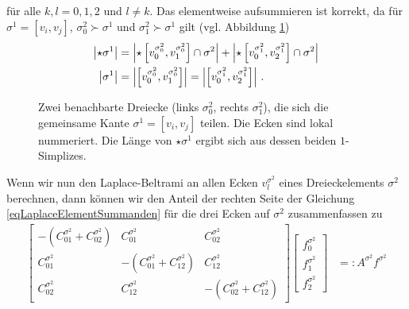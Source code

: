     für alle \( k,l = 0,1,2 \) und \( l\neq k \).
    Das elementweise aufsummieren ist korrekt, da für \( \sigma^{1}=\left[ v_{i}, v_{j} \right]\),
    \( \sigma^{2}_{0}\succ\sigma^{1} \) und \( \sigma^{2}_{1}\succ\sigma^{1} \) gilt
    (vgl. Abbildung \ref{figLokaleNummerierung})
    \begin{align}
      \left| \star\sigma^{1} \right| 
        &= \left| \star \left[ v^{\sigma^{2}_{0}}_{0}, v^{\sigma^{2}_{0}}_{1} \right] \cap \sigma^{2}\right|
         + \left| \star \left[ v^{\sigma^{2}_{1}}_{0}, v^{\sigma^{2}_{1}}_{2} \right] \cap \sigma^{2}\right| \\
      \left| \sigma^{1} \right| 
          &= \left|  \left[ v^{\sigma^{2}_{0}}_{0}, v^{\sigma^{2}_{0}}_{1} \right] \right|
           = \left|  \left[ v^{\sigma^{2}_{1}}_{0}, v^{\sigma^{2}_{1}}_{2} \right] \right| \,\text{.}
    \end{align}
    \begin{figure}
      \centering
      \caption[lokale Nummerierung]{Zwei benachbarte Dreiecke (links \( \sigma^{2}_{0} \), rechts \(
          \sigma^{2}_{1} \)), die sich die gemeinsame Kante \( \sigma^{1}=\left[ v_{i}, v_{j} \right] \) teilen.
          Die Ecken sind lokal nummeriert.
          Die Länge von \( \star\sigma^{1} \) ergibt sich aus dessen beiden \( 1 \)-Simplizes.}
      \label{figLokaleNummerierung}
    \end{figure}
    Wenn wir nun den Laplace-Beltrami an allen Ecken \( v^{\sigma^{2}}_{l} \) eines Dreieckelements 
    \( \sigma^{2} \) berechnen, dann können wir den Anteil der rechten Seite
    der Gleichung \eqref{eqLaplaceElementSummanden}
    für die drei Ecken auf \( \sigma^{2} \) zusammenfassen zu
    \begin{align}
      \begin{bmatrix}
        -\left( C^{\sigma^{2}}_{01} + C^{\sigma^{2}}_{02}\right) & C^{\sigma^{2}}_{01} & C^{\sigma^{2}}_{02} \\
        C^{\sigma^{2}}_{01} & -\left( C^{\sigma^{2}}_{01} + C^{\sigma^{2}}_{12}\right) & C^{\sigma^{2}}_{12} \\
        C^{\sigma^{2}}_{02} & C^{\sigma^{2}}_{12} & -\left( C^{\sigma^{2}}_{02} + C^{\sigma^{2}}_{12}\right)
      \end{bmatrix}
      \begin{bmatrix}
        f^{\sigma^{2}}_{0} \\ f^{\sigma^{2}}_{1} \\ f^{\sigma^{2}}_{2}
      \end{bmatrix}
        &=: A^{\sigma^{2}} f^{\sigma^{2}}
    \end{align}
